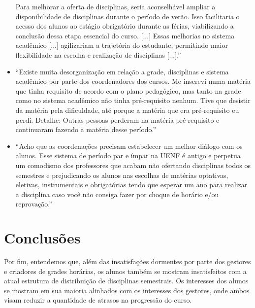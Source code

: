 \begin{apendicesenv}
\begin{itemize}
          Para melhorar a oferta de disciplinas, seria aconselhável ampliar a disponibilidade de disciplinas durante o período de verão. Isso facilitaria o acesso dos alunos ao estágio obrigatório durante as férias, viabilizando a conclusão dessa etapa essencial do curso.
            [...] Essas melhorias no sistema acadêmico [...] agilizariam a trajetória do estudante, permitindo maior flexibilidade na escolha e realização de disciplinas [...].''
    \item ``Existe muita desorganização em relação a grade, disciplinas e sistema acadêmico por parte dos coordenadores dos cursos. Me inscrevi numa matéria que tinha requisito de acordo com o plano pedagógico, mas tanto na grade como no sistema acadêmico não tinha pré-requisito nenhum. Tive que desistir da matéria pela dificuldade, até porque a matéria que era pré-requisito eu perdi. Detalhe: Outras pessoas perderam na matéria pré-requisito e continuaram fazendo a matéria desse período.''
    \item ``Acho que as coordenações precisam estabelecer um melhor diálogo com os alunos. Esse sistema de período par e ímpar na UENF é antigo e perpetua um comodismo dos professores que acabam não ofertando disciplinas todos os semestres e prejudicando os alunos nas escolhas de matérias optativas, eletivas, instrumentais e obrigatórias tendo que esperar um ano para realizar a disciplina caso você não consiga fazer por choque de horário e/ou reprovação.''
  \end{itemize}

  \section*{Conclusões} \label{sec:Conclusões}

  Por fim, entendemos que, além das insatisfações dormentes por parte dos gestores e criadores de grades horárias, os alunos também se mostram insatisfeitos com a atual estrutura de distribuição de disciplinas semestrais. Os interesses dos alunos se mostram em sua maioria alinhados com os interesses dos gestores, onde ambos visam reduzir a quantidade de atrasos na progressão do curso.


\end{apendicesenv}
